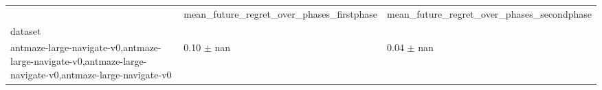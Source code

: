 \begin{tabular}{lll}
\toprule
 & mean_future_regret_over_phases_firstphase & mean_future_regret_over_phases_secondphase \\
dataset &  &  \\
\midrule
antmaze-large-navigate-v0,antmaze-large-navigate-v0,antmaze-large-navigate-v0,antmaze-large-navigate-v0 & 0.10 $\pm$ nan & 0.04 $\pm$ nan \\
\bottomrule
\end{tabular}
